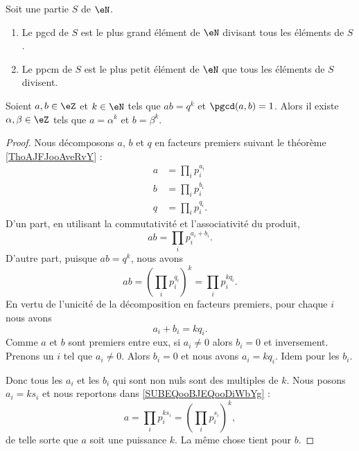 \begin{lemma}       \label{LEMooJIGRooARiIPC}
	Soit une partie \( S\) de \( \eN\).
	\begin{enumerate}
		\item
		      Le pgcd de \( S\) est le plus grand élément de \( \eN\) divisant tous les éléments de \( S\).
		\item
		      Le ppcm de \( S\) est le plus petit élément de \( \eN\) que tous les éléments de \( S\) divisent.
	\end{enumerate}
\end{lemma}

\begin{lemma}        \label{LEMooEVIZooPAkQZW}
	Soient \( a,b\in \eZ\) et \( k\in \eN\) tels que \( ab=q^k\) et \( \pgcd(a,b)=1\). Alors il existe \( \alpha,\beta\in\eZ\) tels que \( a=\alpha^k\) et \( b=\beta^k\).
\end{lemma}

\begin{proof}
	Nous décomposons \( a\), \( b\) et \( q\) en facteurs premiers suivant le théorème \ref{ThoAJFJooAveRvY} :
	\begin{subequations}
		\begin{align}
			a & = \prod_ip_i^{a_i}      \label{SUBEQooBJEQooDiWbYg} \\
			b & = \prod_ip_i^{b_i}                                  \\
			q & = \prod_{i}p_i^{q_i}.
		\end{align}
	\end{subequations}
	D'un part, en utilisant la commutativité et l'associativité du produit,
	\begin{equation}
		ab=\prod_ip_i^{a_i+b_i}.
	\end{equation}
	D'autre part, puisque \( ab=q^k\), nous avons
	\begin{equation}
		ab=(\prod_ip_i^{q_i})^k=\prod_ip_i^{kq_i}.
	\end{equation}
	En vertu de l'unicité de la décomposition en facteurs premiers, pour chaque \( i\) nous avons
	\begin{equation}
		a_i+b_i=kq_i.
	\end{equation}
	Comme \( a\) et \( b\) sont premiers entre eux, si \( a_i\neq0\) alors \( b_i=0\) et inversement. Prenons un \( i\) tel que \( a_i\neq 0\). Alors \( b_i=0\) et nous avons \( a_i=kq_i\). Idem pour les \( b_i\).

	Donc tous les \( a_i\) et les \( b_i\) qui sont non nuls sont des multiples de \( k\). Nous posons \( a_i=ks_i\) et nous reportons dans \eqref{SUBEQooBJEQooDiWbYg} :
	\begin{equation}
		a=\prod_ip_i^{ks_i}=(\prod_ip_i^{s_i})^k,
	\end{equation}
	de telle sorte que \( a\) soit une puissance \( k\)\ieme. La même chose tient pour \( b\).
\end{proof}

